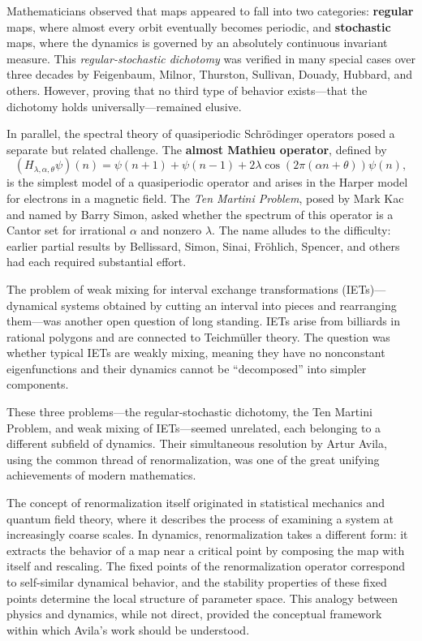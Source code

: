 Mathematicians observed that maps appeared to fall into two categories: \textbf{regular} maps, where almost every orbit eventually becomes periodic, and \textbf{stochastic} maps, where the dynamics is governed by an absolutely continuous invariant measure. This \emph{regular-stochastic dichotomy} was verified in many special cases over three decades by Feigenbaum, Milnor, Thurston, Sullivan, Douady, Hubbard, and others. However, proving that no third type of behavior exists---that the dichotomy holds universally---remained elusive.

In parallel, the spectral theory of quasiperiodic Schr\"{o}dinger operators posed a separate but related challenge. The \textbf{almost Mathieu operator}, defined by
\[
(H_{\lambda,\alpha,\theta}\psi)(n) = \psi(n+1) + \psi(n-1) + 2\lambda\cos(2\pi(\alpha n+\theta))\psi(n),
\]
is the simplest model of a quasiperiodic operator and arises in the Harper model for electrons in a magnetic field. The \emph{Ten Martini Problem}, posed by Mark Kac and named by Barry Simon, asked whether the spectrum of this operator is a Cantor set for irrational $\alpha$ and nonzero $\lambda$. The name alludes to the difficulty: earlier partial results by Bellissard, Simon, Sinai, Fr\"{o}hlich, Spencer, and others had each required substantial effort.

The problem of weak mixing for interval exchange transformations (IETs)---dynamical systems obtained by cutting an interval into pieces and rearranging them---was another open question of long standing. IETs arise from billiards in rational polygons and are connected to Teichm\"{u}ller theory. The question was whether typical IETs are weakly mixing, meaning they have no nonconstant eigenfunctions and their dynamics cannot be ``decomposed'' into simpler components.

These three problems---the regular-stochastic dichotomy, the Ten Martini Problem, and weak mixing of IETs---seemed unrelated, each belonging to a different subfield of dynamics. Their simultaneous resolution by Artur Avila, using the common thread of renormalization, was one of the great unifying achievements of modern mathematics.

The concept of renormalization itself originated in statistical mechanics and quantum field theory, where it describes the process of examining a system at increasingly coarse scales. In dynamics, renormalization takes a different form: it extracts the behavior of a map near a critical point by composing the map with itself and rescaling. The fixed points of the renormalization operator correspond to self-similar dynamical behavior, and the stability properties of these fixed points determine the local structure of parameter space. This analogy between physics and dynamics, while not direct, provided the conceptual framework within which Avila's work should be understood.

